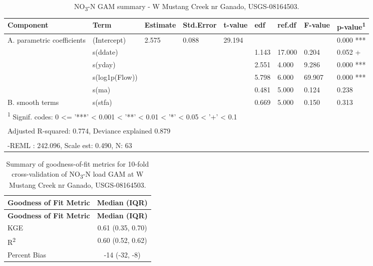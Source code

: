 \documentclass[
]{article}
\newenvironment{widestuff}{\begin{table}[h]\begin{adjustwidth}{-4.5cm}{-4.5cm}\centering}{\end{adjustwidth}\end{table}}
\begin{document}
\begin{widestuff}

\caption{NO\textsubscript{3}-N GAM summary - W Mustang Creek nr Ganado, USGS-08164503.}
\centering
\begin{tabular}[t]{lllllllll}
\toprule
Component & Term & Estimate & Std.Error & t-value & edf & ref.df & F-value & p-value\textsuperscript{1}\\
\midrule
A. parametric coefficients & (Intercept) & 2.575 & 0.088 & 29.194 &  &  &  & 0.000 ***\\
\cmidrule{1-9}
 & s(ddate) &  &  &  & 1.143 & 17.000 & 0.204 & 0.052 +\\

 & s(yday) &  &  &  & 2.551 & 4.000 & 9.286 & 0.000 ***\\

 & s(log1p(Flow)) &  &  &  & 5.798 & 6.000 & 69.907 & 0.000 ***\\

 & s(ma) &  &  &  & 0.481 & 5.000 & 0.124 & 0.238\\

\multirow[t]{-5}{*}{\raggedright\arraybackslash B. smooth terms} & s(stfa) &  &  &  & 0.669 & 5.000 & 0.150 & 0.313\\
\bottomrule
\multicolumn{9}{l}{\textsuperscript{1} Signif. codes: 0 <= '***' < 0.001 < '**' < 0.01 < '*' < 0.05 < '+' < 0.1}\\
\multicolumn{9}{l}{\textsuperscript{} Adjusted R-squared: 0.774, Deviance explained 0.879}\\
\multicolumn{9}{l}{\textsuperscript{} -REML : 242.096, Scale est: 0.490, N: 63}\\
\end{tabular}
\end{widestuff}

\hypertarget{tbl-NO08164503-CV}{}
\begin{longtable}[]{@{}lc@{}}
\caption{\label{tbl-NO08164503-CV}Summary of goodness-of-fit metrics for
10-fold cross-validation of NO\textsubscript{3}-N load GAM at W Mustang
Creek nr Ganado, USGS-08164503.}\tabularnewline
\toprule()
\textbf{Goodness of Fit Metric} & \textbf{Median (IQR)} \\
\midrule()
\endfirsthead
\toprule()
\textbf{Goodness of Fit Metric} & \textbf{Median (IQR)} \\
\midrule()
\endhead
KGE & 0.61 (0.35, 0.70) \\
R\textsuperscript{2} & 0.60 (0.52, 0.62) \\
Percent Bias & -14 (-32, -8) \\
\bottomrule()
\end{longtable}
\end{document}
